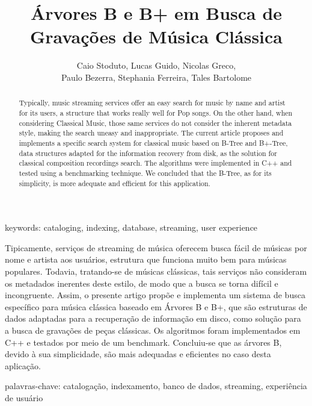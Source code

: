 \documentclass[12pt]{article}
\title{Árvores B e B\nolinebreak+ em Busca de Gravações de Música Clássica\\}
\author{Caio Stoduto\inst{1}, Lucas Guido\inst{1}, Nicolas Greco\inst{1},\\
Paulo Bezerra\inst{1}, Stephania Ferreira\inst{1}, Tales Bartolome\inst{1}}
\begin{document}
 

\maketitle

\begin{abstract}
  Typically, music streaming services offer an easy search for music by name and
  artist for its users, a structure that works really well for Pop songs.
  On the other hand, when considering Classical Music, those same services do
  not consider the inherent metadata style, making the search uneasy and inappropriate.
  The current article proposes and implements a specific search system for
  classical music based on B-Tree and B+-Tree, data structures adapted for the
  information recovery from disk, as the solution for classical composition
  recordings search.
  The algorithms were implemented in C++ and tested using a benchmarking technique.
  We concluded that the B-Tree, as for its simplicity, is more adequate and
  efficient for this application.
\end{abstract}

\begin{flushleft}
keywords: cataloging, indexing, database, streaming, user experience
\end{flushleft}
     
\begin{resumo} 
  Tipicamente, serviços de streaming de música oferecem busca fácil de músicas
  por nome e artista aos usuários, estrutura que funciona muito bem para músicas
  populares.
  Todavia, tratando-se de músicas clássicas, tais serviços não consideram os 
  metadados inerentes deste estilo, de modo que a busca se torna difícil e incongruente.
  Assim, o presente artigo propõe e implementa um sistema de busca específico para música
  clássica baseado em Árvores B e B+, que são estruturas de dados adaptadas para a
  recuperação de informação em disco, como solução para a busca de gravações de
  peças clássicas.
  Os algoritmos foram implementados em C++ e testados por meio de um benchmark.
  Concluiu-se que as árvores B, devido à sua simplicidade, são mais adequadas e
  eficientes no caso desta aplicação.
\end{resumo}

\begin{flushleft}
palavras-chave: catalogação, indexamento, banco de dados, streaming, experiência de usuário
\end{flushleft}
\end{document}
